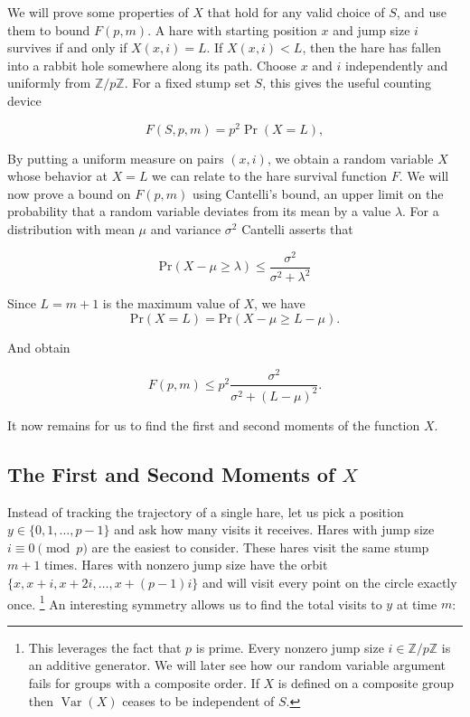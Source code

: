 \documentclass{article}
\begin{document}
We will prove some properties of $X$ that hold for any valid choice of $S$, and use them to bound $F(p,m)$.
A hare with starting position $x$ and jump size $i$ survives if and only if $X(x,i)=L$.
If $X(x,i)<L$, then the hare has fallen into a rabbit hole somewhere along its path. Choose $x$ and $i$
independently and uniformly from $\mathbb{Z}/p\mathbb{Z}$. For a fixed stump set $S$, this gives the useful counting device

\begin{equation}
F(S,p,m)=p^2\Pr(X=L),
\end{equation}

By putting a uniform measure on pairs $(x,i)$, we obtain a random variable $X$ whose behavior at $X=L$
we can relate to the hare survival function $F$. We will now prove a bound on $F(p,m)$ using Cantelli's bound, an upper limit on the
probability that a random variable deviates from its mean by a value $\lambda$. For a distribution with mean $\mu$ and variance $\sigma^2$
Cantelli asserts that

\begin{equation}
    \text{Pr}(X-\mu \geq \lambda) \leq \frac{\sigma^2}{\sigma^2 + \lambda^2}
\end{equation}

Since $L=m+1$ is the maximum value of $X$, we have
\begin{equation}
    \text{Pr}(X=L) = \text{Pr}(X-\mu \geq L-\mu).
\end{equation}

And obtain 

\begin{equation}
    F(p,m) \leq p^2 \frac{\sigma^2}{\sigma^2+(L-\mu)^2}.
\end{equation}

It now remains for us to find the first and second moments of the function $X$.

\subsection{The First and Second Moments of $X$}

Instead of tracking the trajectory of a single hare, let us pick a position $y \in \{0,1,\dots,p-1\}$ and ask how many visits it receives.
Hares with jump size $i \equiv 0 \pmod p$ are the easiest to consider. These hares visit the same stump $m+1$ times. Hares with nonzero jump size
have the orbit $\{x, x+i, x+2i, \dots, x+(p-1)i\}$ and
will visit every point on the circle exactly once. \footnote{This leverages the fact that $p$ is prime. Every nonzero jump size $i\in\mathbb{Z}/p\mathbb{Z}$ is an additive generator. We will later see how our random variable
 argument fails for groups with a composite order. If $X$ is defined on a composite group then $\operatorname{Var}(X)$ ceases to be independent of $S$.} An interesting symmetry allows us to find the total visits to $y$ at time $m$:
\end{document}
